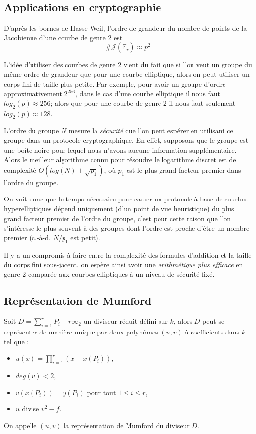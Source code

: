 \documentclass[a4paper,12pt]{article}
\theoremstyle{definition}
\theoremstyle{remark}
\numberwithin{equation}{section}
\begin{document}
\subsection{Applications en cryptographie}
D'après les bornes de Hasse-Weil, l'ordre de grandeur du nombre de points de la Jacobienne d'une courbe de genre 2 est
$$\#\mathcal{J}(\mathbb{F}_p) \approx p^2$$

L'idée d'utiliser des courbes de genre $2$ vient du fait que si l'on veut un groupe du même ordre de grandeur que pour une courbe elliptique, alors on peut utiliser un corps fini de taille plus petite. Par exemple, pour avoir un groupe d'ordre approximativement $2^{256}$, dans le cas d'une courbe elliptique il nous faut $log_2(p) \approx 256$; alors que pour une courbe de genre 2 il nous faut seulement $log_2(p) \approx 128$.

L'ordre du groupe $N$ mesure la \emph{sécurité} que l'on peut espérer en utilisant ce groupe dans un protocole cryptographique.
En effet, supposons que le groupe est une boîte noire pour lequel nous n’avons aucune information supplémentaire. Alors le meilleur algorithme connu pour résoudre le logarithme discret est de complexité $O(log(N)+\sqrt{p_1})$, où $p_1$ est le plus grand facteur premier dans l'ordre du groupe.

On voit donc que le temps nécessaire pour casser un protocole à base de courbes hyperelliptiques dépend uniquement (d'un point de vue heuristique) du plus grand facteur premier de l'ordre du groupe, c'est pour cette raison que l'on s'intéresse le plus souvent à des groupes dont l'ordre est proche d'être un nombre premier (c.-à-d. $N/p_1$ est petit).

Il y a un compromis à faire entre la complexité des formules d'addition et la taille du corps fini sous-jacent, on espère ainsi avoir une \emph{arithmétique plus efficace} en genre 2 comparée aux courbes elliptiques à un niveau de sécurité fixé.
 
\subsection{Représentation de Mumford}
Soit $D = \sum_{i=1}^r{P_i} - r\infty_2$ un diviseur réduit défini sur $k$, alors $D$ peut se représenter de manière unique par deux polynômes $(u,v)$ à coefficients dans $k$ tel que :
\begin{itemize}
\item $u(x) =  \prod_{i=1}^r (x - x(P_i) )$,
\item $deg(v) < 2$,
\item $v(x(P_i)) = y(P_i)$ pour tout $1 \leq i \leq r$,
\item $u$ divise $v^2 - f$.
\end{itemize}
On appelle $(u,v)$ la représentation de Mumford du diviseur $D$.
\end{document}
